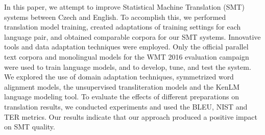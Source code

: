 In this paper, we attempt to improve Statistical Machine Translation (SMT) systems between Czech and English. To accomplish this, we performed translation model training, created adaptations of training settings for each language pair, and obtained comparable corpora for our SMT systems. Innovative tools and data adaptation techniques were employed. Only the official parallel text corpora and monolingual models for the WMT 2016 evaluation campaign were used to train language models, and to develop, tune, and test the system. We explored the use of domain adaptation techniques, symmetrized word alignment models, the unsupervised transliteration models and the KenLM language modeling tool. To evaluate the effects of different preparations on translation results, we conducted experiments and used the BLEU, NIST and TER metrics. Our results indicate that our approach produced a positive impact on SMT quality.
